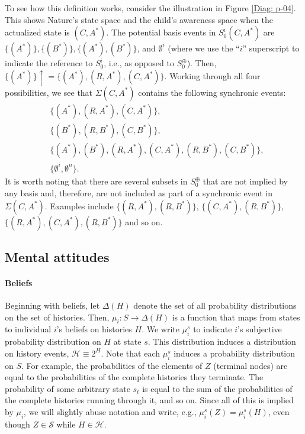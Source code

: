 \documentclass[
11pt,
titlepage,
reqno,
]{article}%
\theoremstyle{definition}
\begin{document}
To see how this definition works, consider the illustration in Figure \ref{Diag: p-04}. 
This shows Nature's state space and the child's  awareness space when the actualized state is $(C,A^\ast)$. 
The potential basis events in $S^i_0(C,A^\ast)$ are $\{(A^\ast)\},\{(B^\ast)\},\{(A^\ast),(B^\ast)\}$, and $\emptyset^i$ (where we use the ``$i$'' superscript to indicate the reference to $S^i_0$, i.e., as opposed to $S^\oplus_0$). 
Then, $\{(A^\ast)\}\uparrow = \{(A^\ast), (R,A^\ast),(C,A^\ast)\}$. 
Working through all four possibilities, we see that $\Sigma(C,A^\ast)$ contains the following synchronic events:
\begin{align*}
	&	\{(A^\ast), (R,A^\ast),(C,A^\ast)\},\\
	&	\{(B^\ast), (R,B^\ast),(C,B^\ast)\},\\
	&	\{(A^\ast), (B^\ast), (R,A^\ast),(C,A^\ast), (R,B^\ast),(C,B^\ast)\},\\
	&	\{\emptyset^i,\emptyset^n\}.
\end{align*}
It is worth noting that there are several subsets in $S^\oplus_0$ that are not implied by any basis and, therefore, are not included as part of a synchronic event in $\Sigma(C,A^\ast)$. Examples include $\{(R,A^\ast),(R,B^\ast)\}$, $\{(C,A^\ast),(R,B^\ast)\}$, $\{(R,A^\ast),(C,A^\ast),(R,B^\ast)\}$ and so on. 
	

\subsection{Mental attitudes\label{sec:attitudes}}

\paragraph{Beliefs \label{para: beliefs}}
	Beginning with beliefs, let $\Delta(H)$ denote the set of all probability distributions on the set of histories. 
	Then,  $\mu_i:S\rightarrow \Delta(H)$ is a function that maps from states to individual $i$'s beliefs on histories $H$. 
	We write  $\mu_i^s$ to indicate $i$'s subjective probability distribution on $H$ at state $s$.
	This distribution induces a distribution on history events, $\mathcal{H}\equiv 2^H$. 
	Note that each $\mu_i^s$ induces a probability distribution on $S$.
	For example, the probabilities of the elements of $Z$ (terminal nodes) are equal to the probabilities of the complete histories they terminate. 
	The probability of some arbitrary state $s_t$ is equal to the sum of the probabilities of the complete histories running through it, and so on.
	Since all of this is implied by $\mu_i$, we will slightly abuse notation and write, e.g.,  $\mu_i^s(Z)=\mu_i^s(H)$, even though $Z\in \mathcal{S}$ while $H\in \mathcal{H}$.
	
\end{document}
